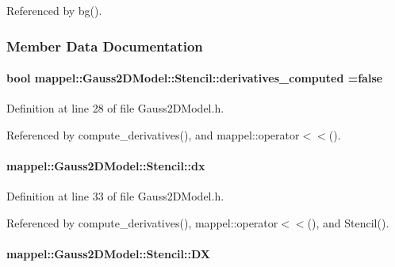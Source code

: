 Referenced by bg().



\subsubsection{Member Data Documentation}
\paragraph[{\texorpdfstring{derivatives\+\_\+computed}{derivatives_computed}}]{\setlength{\rightskip}{0pt plus 5cm}bool mappel\+::\+Gauss2\+D\+Model\+::\+Stencil\+::derivatives\+\_\+computed =false}\hypertarget{classmappel_1_1Gauss2DModel_1_1Stencil_a3934a1152e447ec858bf576a7da4d305}{}\label{classmappel_1_1Gauss2DModel_1_1Stencil_a3934a1152e447ec858bf576a7da4d305}


Definition at line 28 of file Gauss2\+D\+Model.\+h.



Referenced by compute\+\_\+derivatives(), and mappel\+::operator$<$$<$().

\paragraph[{\texorpdfstring{dx}{dx}}]{ mappel\+::\+Gauss2\+D\+Model\+::\+Stencil\+::dx}\hypertarget{classmappel_1_1Gauss2DModel_1_1Stencil_a1326ab9634585b882909abf468f9cd36}{}\label{classmappel_1_1Gauss2DModel_1_1Stencil_a1326ab9634585b882909abf468f9cd36}


Definition at line 33 of file Gauss2\+D\+Model.\+h.



Referenced by compute\+\_\+derivatives(), mappel\+::operator$<$$<$(), and Stencil().

\paragraph[{\texorpdfstring{DX}{DX}}]{ mappel\+::\+Gauss2\+D\+Model\+::\+Stencil\+::\+DX}\hypertarget{classmappel_1_1Gauss2DModel_1_1Stencil_a393169d632114c7ff5d55920935919e4}{}\label{classmappel_1_1Gauss2DModel_1_1Stencil_a393169d632114c7ff5d55920935919e4}


